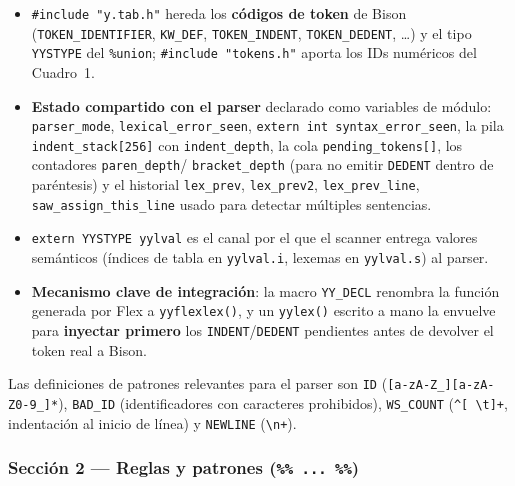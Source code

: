 \begin{itemize}
  \item \texttt{\#include "y.tab.h"} hereda los \textbf{códigos de token} de
    Bison (\texttt{TOKEN\_IDENTIFIER}, \texttt{KW\_DEF}, \texttt{TOKEN\_INDENT},
    \texttt{TOKEN\_DEDENT}, \ldots) y el tipo \texttt{YYSTYPE} del
    \texttt{\%union}; \texttt{\#include "tokens.h"} aporta los IDs numéricos
    del Cuadro~1.
  \item \textbf{Estado compartido con el parser} declarado como variables de
    módulo: \texttt{parser\_mode}, \texttt{lexical\_error\_seen},
    \texttt{extern int syntax\_error\_seen}, la pila
    \texttt{indent\_stack[256]} con \texttt{indent\_depth}, la cola
    \texttt{pending\_tokens[]}, los contadores \texttt{paren\_depth}/%
    \texttt{bracket\_depth} (para no emitir \texttt{DEDENT} dentro de
    paréntesis) y el historial \texttt{lex\_prev}, \texttt{lex\_prev2},
    \texttt{lex\_prev\_line}, \texttt{saw\_assign\_this\_line} usado para
    detectar múltiples sentencias.
  \item \texttt{extern YYSTYPE yylval} es el canal por el que el scanner
    entrega valores semánticos (índices de tabla en \texttt{yylval.i},
    lexemas en \texttt{yylval.s}) al parser.
  \item \textbf{Mecanismo clave de integración}: la macro
    \texttt{YY\_DECL} renombra la función generada por Flex a
    \texttt{yyflexlex()}, y un \texttt{yylex()} escrito a mano la envuelve
    para \textbf{inyectar primero} los \texttt{INDENT}/\texttt{DEDENT}
    pendientes antes de devolver el token real a Bison.
\end{itemize}



Las definiciones de patrones relevantes para el parser son \texttt{ID}
(\texttt{[a-zA-Z\_][a-zA-Z0-9\_]*}), \texttt{BAD\_ID} (identificadores con
caracteres prohibidos), \texttt{WS\_COUNT} (\texttt{\textasciicircum[ \textbackslash t]+},
indentación al inicio de línea) y \texttt{NEWLINE} (\texttt{\textbackslash n+}).

\subsubsection{Sección 2 --- Reglas y patrones (\texttt{\%\% ... \%\%})}

